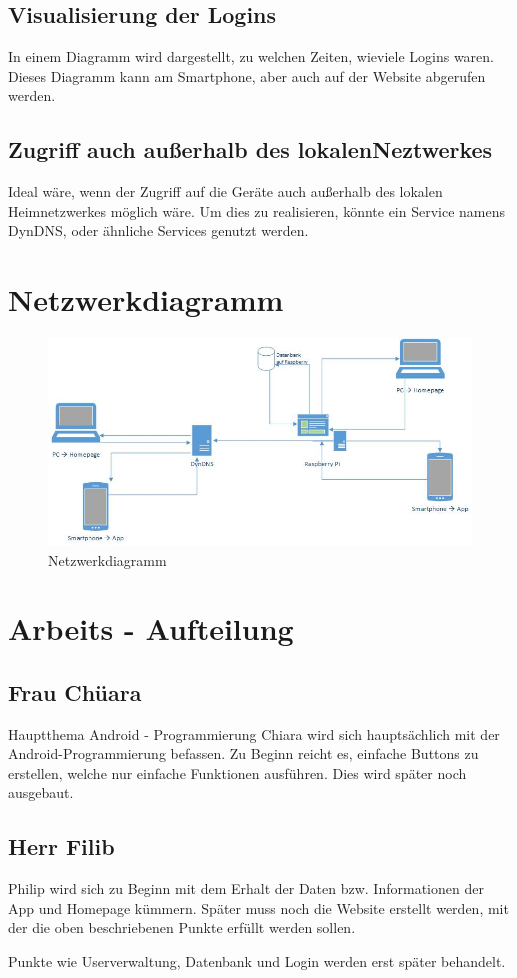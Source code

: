 \documentclass[10pt,a4paper]{report}
\begin{document}
\subsection{Visualisierung der Logins}
In einem Diagramm wird dargestellt, zu welchen Zeiten, wieviele Logins waren. Dieses Diagramm kann am Smartphone, aber auch auf der Website abgerufen werden.

\subsection{Zugriff auch außerhalb des lokalenNeztwerkes}
Ideal wäre, wenn der Zugriff auf die Geräte auch außerhalb des lokalen Heimnetzwerkes möglich wäre. Um dies zu realisieren, könnte ein Service namens DynDNS, oder ähnliche Services genutzt werden. 

\section{Netzwerkdiagramm}
\begin{figure}[ht]
	\centering
  	\includegraphics[width=1\textwidth]{netzwerkdiagramm.jpg}
	\caption{Netzwerkdiagramm}
	\label{netzwerkdiagramm}
\end{figure}

\section{Arbeits - Aufteilung}
\subsection{Frau Chüara}
Hauptthema Android - Programmierung
Chiara wird sich hauptsächlich mit der Android-Programmierung befassen. Zu Beginn reicht es, einfache Buttons zu erstellen, welche nur einfache Funktionen ausführen. Dies wird später noch ausgebaut.

\subsection{Herr Filib}
Philip wird sich zu Beginn mit dem Erhalt der Daten bzw. Informationen der App und Homepage kümmern. Später muss noch die Website erstellt werden, mit der die oben beschriebenen Punkte erfüllt werden sollen. 

\bigskip
Punkte wie Userverwaltung, Datenbank und Login werden erst später behandelt.
\end{document}
